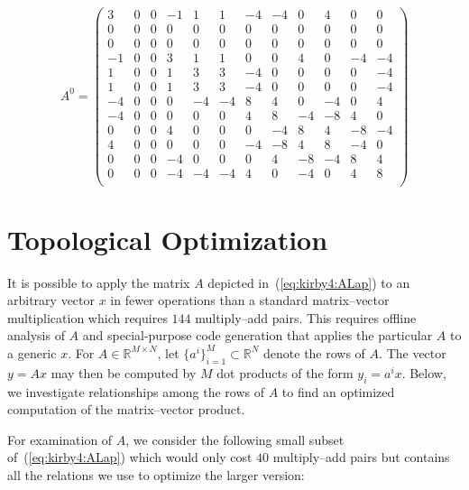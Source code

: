 \begin{equation} \label{eq:kirby4:ALap}
A^0 =
\left(
\begin{array}{cc|cc|cc|cc|cc|cc}
3 & 0 & 0 & -1 & 1 & 1 & -4 & -4 & 0 & 4 & 0 & 0 \\
0 & 0 & 0 & 0 & 0 & 0 & 0 & 0 & 0 & 0 & 0 & 0 \\ \hline
0 & 0 & 0 & 0 & 0 & 0 & 0 & 0 & 0 & 0 & 0 & 0 \\
-1 & 0 & 0 & 3 & 1 & 1 & 0 & 0 & 4 & 0 & -4 & -4 \\ \hline
1 & 0 & 0 & 1 & 3 & 3 & -4 & 0 & 0 & 0 & 0 & -4 \\
1 & 0 & 0 & 1 & 3 & 3 & -4 & 0 & 0 & 0 & 0 & -4 \\ \hline
-4 & 0 & 0 & 0 & -4 & -4 & 8 & 4 & 0 & -4 & 0 & 4 \\
-4 & 0 & 0 & 0 & 0 & 0 & 4 & 8 & -4 & -8 & 4 & 0 \\ \hline
0 & 0 & 0 & 4 & 0 & 0 & 0 & -4 & 8 & 4 & -8 & -4 \\
4 & 0 & 0 & 0 & 0 & 0 & -4 & -8 & 4 & 8 & -4 & 0 \\ \hline
0 & 0 & 0 & -4 & 0 & 0 & 0 & 4 & -8 & -4 & 8 & 4 \\
0 & 0 & 0 & -4 & -4 & -4 & 4 & 0 & -4 & 0 & 4 & 8 \\
\end{array}
\right)
\end{equation}

\section{Topological Optimization}

It is possible to apply the matrix $A$ depicted
in~(\ref{eq:kirby4:ALap}) to an arbitrary vector $x$ in fewer
operations than a standard matrix--vector multiplication which
requires $144$ multiply--add pairs. This requires offline analysis of
$A$ and special-purpose code generation that applies the particular
$A$ to a generic $x$. For \( A \in \mathbb{R}^{M\times N} \), let $\{
a^i \}_{i=1}^M \subset \mathbb{R}^N$ denote the rows of \( A \).  The
vector \( y = Ax \) may then be computed by \( M \) dot products of
the form \( y_i = a^i x \).  Below, we investigate relationships among
the rows of \( A \) to find an optimized computation of the
matrix--vector product.

For examination of $A$, we consider the following small subset
of~(\ref{eq:kirby4:ALap}) which would only cost $40$ multiply--add
pairs but contains all the relations we use to optimize the larger
version:

